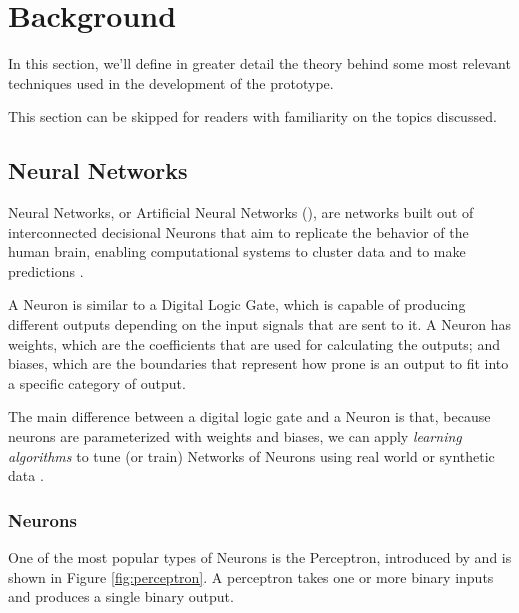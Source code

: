 \chapter{Background}\label{cap:referencialTeorico}

In this section, we'll define in greater detail the theory behind some most
relevant techniques used in the development of the prototype.

This section can be skipped for readers with familiarity on the topics discussed.

\section{Neural Networks}

Neural Networks, or Artificial Neural Networks (),
are networks built out of interconnected decisional Neurons that aim to replicate 
the behavior of the human brain, enabling computational systems to cluster data
and to make predictions \cite{IBMNeuralNetworks}. 

A Neuron is similar to a Digital Logic Gate, which is capable of producing 
different outputs depending on the input signals that are sent to it.
A Neuron has weights, which are the coefficients that are used for calculating
the outputs; and biases, which are the boundaries that represent how prone is an output
to fit into a specific category of output. 

The main difference between a digital logic gate and a Neuron is that, because neurons are
parameterized with weights and biases, we can apply \textit{learning algorithms}
to tune (or train) Networks of Neurons using real world or synthetic data \cite{Nielsen2015}.

\subsection{Neurons}

One of the most popular types of Neurons is the Perceptron, introduced by 
\cite{Rosenblatt1958} and is shown in Figure \ref{fig:perceptron}. 
A perceptron takes one or more binary inputs and produces a single binary output.

